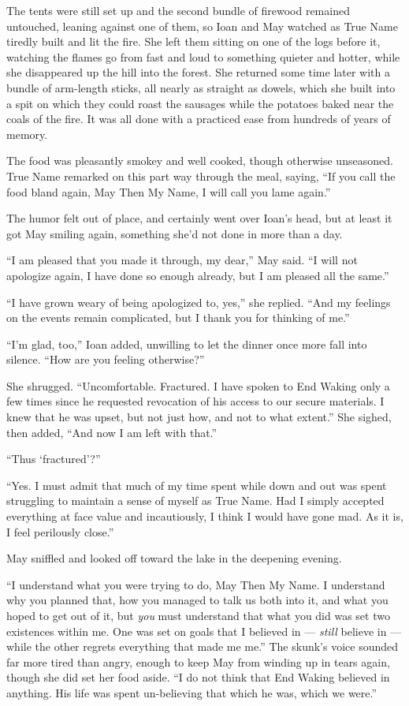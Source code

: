 The tents were still set up and the second bundle of firewood remained untouched, leaning against one of them, so Ioan and May watched as True Name tiredly built and lit the fire. She left them sitting on one of the logs before it, watching the flames go from fast and loud to something quieter and hotter, while she disappeared up the hill into the forest. She returned some time later with a bundle of arm-length sticks, all nearly as straight as dowels, which she built into a spit on which they could roast the sausages while the potatoes baked near the coals of the fire. It was all done with a practiced ease from hundreds of years of memory.

The food was pleasantly smokey and well cooked, though otherwise unseasoned. True Name remarked on this part way through the meal, saying, ``If you call the food bland again, May Then My Name, I will call you lame again.''

The humor felt out of place, and certainly went over Ioan's head, but at least it got May smiling again, something she'd not done in more than a day.

``I am pleased that you made it through, my dear,'' May said. ``I will not apologize again, I have done so enough already, but I am pleased all the same.''

``I have grown weary of being apologized to, yes,'' she replied. ``And my feelings on the events remain complicated, but I thank you for thinking of me.''

``I'm glad, too,'' Ioan added, unwilling to let the dinner once more fall into silence. ``How are you feeling otherwise?''

She shrugged. ``Uncomfortable. Fractured. I have spoken to End Waking only a few times since he requested revocation of his access to our secure materials. I knew that he was upset, but not just how, and not to what extent.'' She sighed, then added, ``And now I am left with that.''

``Thus `fractured'?''

``Yes. I must admit that much of my time spent while down and out was spent struggling to maintain a sense of myself as True Name. Had I simply accepted everything at face value and incautiously, I think I would have gone mad. As it is, I feel perilously close.''

May sniffled and looked off toward the lake in the deepening evening.

``I understand what you were trying to do, May Then My Name. I understand why you planned that, how you managed to talk us both into it, and what you hoped to get out of it, but \emph{you} must understand that what you did was set two existences within me. One was set on goals that I believed in — \emph{still} believe in — while the other regrets everything that made me me.'' The skunk's voice sounded far more tired than angry, enough to keep May from winding up in tears again, though she did set her food aside. ``I do not think that End Waking believed in anything. His life was spent un-believing that which he was, which we were.''

